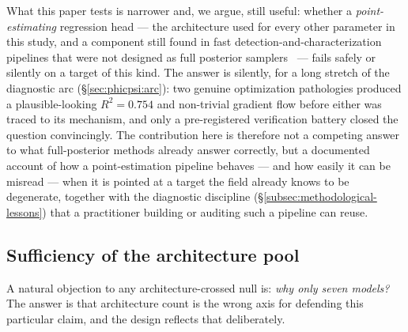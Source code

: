 \documentclass[11pt]{article}
\begin{document}
What this paper tests is narrower and, we argue, still useful: whether a \emph{point-estimating} regression head --- the architecture used for every other parameter in this study, and a component still found in fast detection-and-characterization pipelines that were not designed as full posterior samplers~\citep{george2018deep} --- fails safely or silently on a target of this kind.
The answer is silently, for a long stretch of the diagnostic arc (\S\ref{sec:phicpsi:arc}): two genuine optimization pathologies produced a plausible-looking $R^2 = 0.754$ and non-trivial gradient flow before either was traced to its mechanism, and only a pre-registered verification battery closed the question convincingly.
The contribution here is therefore not a competing answer to what full-posterior methods already answer correctly, but a documented account of how a point-estimation pipeline behaves --- and how easily it can be misread --- when it is pointed at a target the field already knows to be degenerate, together with the diagnostic discipline (\S\ref{subsec:methodological-lessons}) that a practitioner building or auditing such a pipeline can reuse.

\subsection{Sufficiency of the architecture pool}
\label{sec:phicpsi:pool}

A natural objection to any architecture-crossed null is: \emph{why only seven models?}
The answer is that architecture count is the wrong axis for defending this particular claim, and the design reflects that deliberately.
\end{document}
